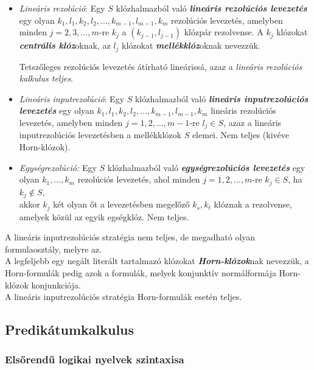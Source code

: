 \documentclass[tikz,12pt,margin=0px]{article}
\begin{document}
	\begin{itemize}
        \item \textit{Lineáris rezolúció}: Egy $S$ klózhalmazból való \textbf{\emph{lineáris rezolúciós levezetés}} egy olyan $k_{1},l_{1},k_{2},l_{2}, \ldots, k_{m-1},l_{m-1}, k_{m}$ rezolúciós levezetés, amelyben minden $j = 2, 3, \ldots, m$-re $k_{j}$ a $(k_{j-1},l_{j-1})$ klózpár rezolvense. A $k_{j}$ klózokat \emph{\textbf{centrális klóz}}oknak, az $l_{j}$ klózokat \textbf{\emph{mellékklóz}}oknak nevezzük.		
		
		\noindent Tetszőleges rezolúciós levezetés átírható lineárissá, azaz a \emph{lineáris rezolúciós kalkulus teljes}.
		
        \item \textit{Lineáris inputrezolúció}: Egy $S$ klózhalmazból való \textbf{\emph{lineáris inputrezolúciós levezetés}} egy olyan $k_{1},l_{1},k_{2},l_{2}, \ldots, k_{m-1},l_{m-1}, k_{m}$ lineáris rezolúciós levezetés, amelyben minden 	$j = 1, 2, \ldots, m-1$-re $l_{j} \in S$, azaz a lineáris inputrezolúciós levezetésben a mellékklózok $S$ elemei. Nem teljes (kivéve Horn-klózok).

        \item \textit{Egységrezolúció:} Egy $S$ klózhalmazból való \textbf{\emph{egységrezolúciós levezetés}} egy olyan $k_{1}, \ldots, k_{m}$ rezolúciós levezetés, ahol minden $j = 1, 2, \ldots, m$-re $k_{j} \in S$, ha $k_j \not \in S$, \\
        akkor $k_j$ két olyan őt a levezetésben megelőző $k_s, k_t$ klóznak a rezolvense, amelyek közül az egyik egségklóz. Nem teljes.
	\end{itemize}

    \noindent A lineáris inputrezolúciós stratégia nem teljes, de megadható olyan formulaosztály, melyre az.\\
    A legfeljebb egy negált literált tartalmazó klózokat \textbf{\emph{Horn-klózok}}nak nevezzük, a Horn-formulák pedig azok a formulák, melyek konjunktív normálformája Horn-klózok konjunkciója. \\
    A lineáris inputrezolúciós stratégia Horn-formulák esetén teljes.
	
	\subsection*{Predikátumkalkulus}
	
	\subsubsection*{Elsőrendű logikai nyelvek szintaxisa}
	
\end{document}
